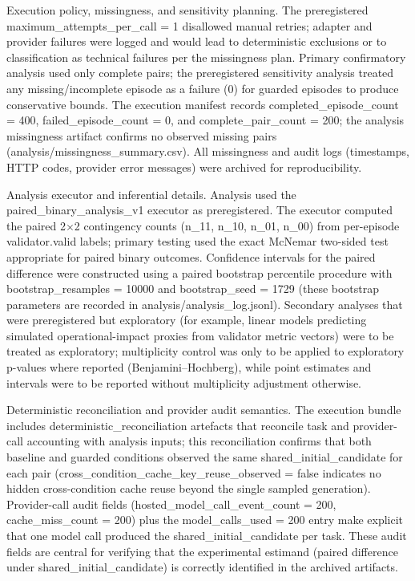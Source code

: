 \documentclass[conference]{IEEEtran}
\begin{document}
Execution policy, missingness, and sensitivity planning. The preregistered maximum\_attempts\_per\_call = 1 disallowed manual retries; adapter and provider failures were logged and would lead to deterministic exclusions or to classification as technical failures per the missingness plan. Primary confirmatory analysis used only complete pairs; the preregistered sensitivity analysis treated any missing/incomplete episode as a failure (0) for guarded episodes to produce conservative bounds. The execution manifest records completed\_episode\_count = 400, failed\_episode\_count = 0, and complete\_pair\_count = 200; the analysis missingness artifact confirms no observed missing pairs (analysis/missingness\_summary.csv). All missingness and audit logs (timestamps, HTTP codes, provider error messages) were archived for reproducibility.

Analysis executor and inferential details. Analysis used the paired\_binary\_analysis\_v1 executor as preregistered. The executor computed the paired 2\ensuremath{\times}2 contingency counts (n\_11, n\_10, n\_01, n\_00) from per-episode validator.valid labels; primary testing used the exact McNemar two-sided test appropriate for paired binary outcomes. Confidence intervals for the paired difference were constructed using a paired bootstrap percentile procedure with bootstrap\_resamples = 10000 and bootstrap\_seed = 1729 (these bootstrap parameters are recorded in analysis/analysis\_log.jsonl). Secondary analyses that were preregistered but exploratory (for example, linear models predicting simulated operational-impact proxies from validator metric vectors) were to be treated as exploratory; multiplicity control was only to be applied to exploratory p-values where reported (Benjamini--Hochberg), while point estimates and intervals were to be reported without multiplicity adjustment otherwise.

Deterministic reconciliation and provider audit semantics. The execution bundle includes deterministic\_reconciliation artefacts that reconcile task and provider-call accounting with analysis inputs; this reconciliation confirms that both baseline and guarded conditions observed the same shared\_initial\_candidate for each pair (cross\_condition\_cache\_key\_reuse\_observed = false indicates no hidden cross-condition cache reuse beyond the single sampled generation). Provider-call audit fields (hosted\_model\_call\_event\_count = 200, cache\_miss\_count = 200) plus the model\_calls\_used = 200 entry make explicit that one model call produced the shared\_initial\_candidate per task. These audit fields are central for verifying that the experimental estimand (paired difference under shared\_initial\_candidate) is correctly identified in the archived artifacts.
\end{document}
